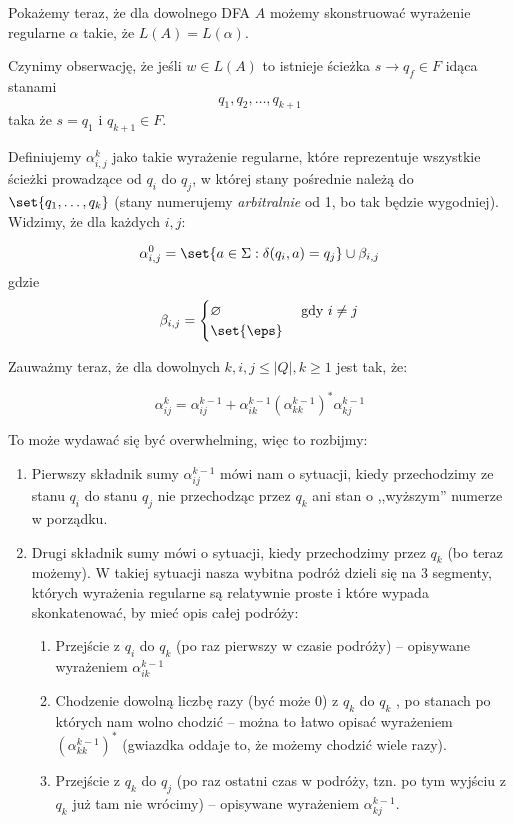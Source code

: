     Pokażemy teraz, że dla dowolnego DFA \(A\) możemy skonstruować wyrażenie regularne \(\alpha\) takie, że \( L(A) = L(\alpha)\). 
    
     Czynimy obserwację, że jeśli \( w \in L(A) \) to istnieje ścieżka \( s \rightarrow q_f \in F \) idąca stanami
    \[
        q_1, q_2, \dots, q_{k+1}
    \]
    taka że \( s = q_1 \) i \( q_{k+1} \in F\).
    
    Definiujemy \( \alpha_{i, j}^k \) jako takie wyrażenie regularne, które reprezentuje wszystkie ścieżki prowadzące od \( q_i \) do \( q_j \), w której stany pośrednie należą do \( \set{q_1, \dots, q_k} \) (stany numerujemy \textit{arbitralnie} od 1, bo tak będzie wygodniej). Widzimy, że dla każdych \(i, j\):
    
    \[
        \alpha_{i, j}^0 = \set{a \in \Sigma : \delta(q_i, a) = q_j } \cup \beta_{i, j}
    \]
    gdzie
    \[
        \beta_{i, j} = \begin{cases}
            \varnothing & \text{ gdy } i \neq j \\
            \set{\eps}
        \end{cases}
    \]
    
    Zauważmy teraz, że dla dowolnych \(k, i, j \leq |Q|, k \geq 1 \) jest tak, że:
    
    \[ 
        \alpha^{k}_{ij} = \alpha^{k-1}_{ij} + \alpha^{k-1}_{ik} (\alpha^{k-1}_{kk})^* \alpha^{k-1}_{kj} 
    \]
    
    To może wydawać się być overwhelming, więc to rozbijmy: 
    
    \begin{enumerate}
        \item Pierwszy składnik sumy \( \alpha^{k-1}_{ij} \) mówi nam o sytuacji, kiedy przechodzimy ze stanu \(q_i\) do stanu \(q_j\) nie przechodząc przez \(q_k\)  ani stan o ,,wyższym'' numerze w porządku.
        \item Drugi składnik sumy mówi o sytuacji, kiedy przechodzimy przez \(q_k\) (bo teraz możemy). W takiej sytuacji nasza wybitna podróż dzieli się na 3 segmenty, których wyrażenia regularne są relatywnie proste i które wypada skonkatenować, by mieć opis całej podróży:
        
        \begin{enumerate}
            \item Przejście z \(q_i\) do \(q_k\) (po raz pierwszy w czasie podróży) -- opisywane wyrażeniem \(\alpha^{k-1}_{ik}\)
            \item Chodzenie dowolną liczbę razy (być może 0) z \(q_k\) do \(q_k\) , po stanach po których nam wolno chodzić -- można to łatwo opisać wyrażeniem \( (\alpha^{k-1}_{kk})^* \) (gwiazdka oddaje to, że możemy chodzić wiele razy).
            \item Przejście z \(q_k\) do \(q_j\) (po raz ostatni czas w podróży, tzn. po tym wyjściu z \(q_k\) już tam nie wrócimy) -- opisywane wyrażeniem \( \alpha^{k-1}_{kj}  \). 
        \end{enumerate}
    \end{enumerate}
    
